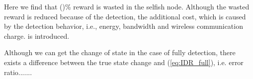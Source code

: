 Here we find that ()\% reward is wasted in the selfish node.
Although the wasted reward is reduced because of the detection,
the additional cost,
which is caused by the detection behavior,
i.e., energy, bandwidth and wireless communication charge.
is introduced.

Although we can get the change of state in the case of fully detection,
there exists a difference between the true state change and (\ref{eq:IDR_full}),
i.e. error ratio.......